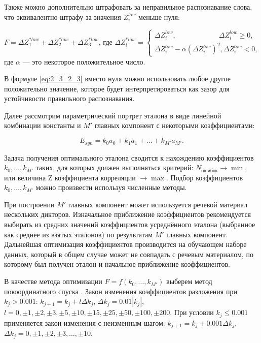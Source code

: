 Также можно дополнительно штрафовать за неправильное распознавание слова, что эквивалентно штрафу за значения $Z^{low}_{i}$ меньше нуля:

\begin{equation} \label{eq:2_3_2_3}
F = \Delta Z^{*low}_{1} + \Delta Z^{*low}_{2} + \Delta Z^{*low}_{3} \text{, где }
\Delta Z^{*low}_{i} = \left\{
\begin{array}{ll}
\Delta Z^{low}_{i}, \qquad\qquad\qquad \Delta Z^{low}_{i} \ge 0,\\
\Delta Z^{low}_{i} - \alpha (\Delta Z^{low}_{i})^2, \Delta Z^{low}_{i} < 0,
\end{array}
\right.
\end{equation}
где $\alpha$ --- это некоторое положительное число.

В формуле \eqref{eq:2_3_2_3} вместо нуля можно использовать любое другое положительно значение, которое будет интерпретироваться как зазор для устойчивости правильного распознавания.

Далее рассмотрим параметрический портрет эталона в виде линейной комбинации константы и $M'$ главных компонент с некоторыми коэффициентами: 

\begin{equation} \label{eq:2_3_2_4}
E_{syn} = k_0 a_0 + k_1 a_1 + \dots + k_{M'} a_{M'}.
\end{equation}

Задача получения оптимального эталона сводится к нахождению коэффициентов $k_0, \dots, k_{M'}$ таких, для которых должен выполняться критерий: $N_{ошибок} \rightarrow \min$, или величина Z коэффициента корреляции $\rightarrow \max$.
Подбор коэффициентов $k_0, \dots, k_{M'}$ можно произвести используя численные методы.

При построении $M'$ главных компонент может используется речевой материал нескольких дикторов.
Изначальное приближение коэффициентов рекомендуется выбирать из средних значений коэффициентов усреднённого эталона (выбранное как среднее из взятых эталонов) по результатам $M'$ главных компонент.
Дальнейшая оптимизация коэффициентов производится на обучающем наборе данных, который в общем случае может не совпадать с речевым материалом, по которому был получен эталон и начальное приближение коэффициентов.

В качестве метода оптимизации $F = f(k_0, \dots, k_{M'})$ выберем метод покоординатного спуска \cite{alekseeva2008, luenberger1984linear}.
Закон изменения коэффициентов разложения при $k_j > 0.001$: $k_{j+1} = k_j + l \Delta k_j$, $\Delta k_j = 0.01 |k_j|$, $l = 0, \pm 1, \pm 2, \pm 3, \pm 5, \pm 10, \pm 15, \pm 25, \pm 50, \pm 100, \pm 200$.
При условии $k_j \le 0.001$ применяется закон изменения с неизменным шагом: $k_{j+1} = k_j + 0.001 \Delta k_j$, $\Delta k_j = 0, \pm 1, \pm 2, \pm 3, \dots, \pm 10$.

